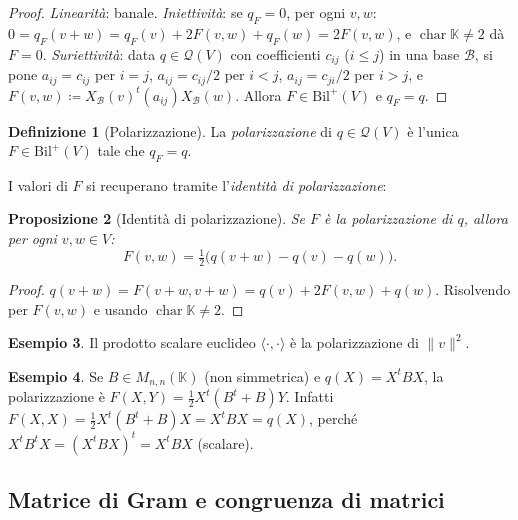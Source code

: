 \documentclass[11pt, a4paper]{book}
\theoremstyle{definition}
\newtheorem{definizione}{Definizione}[section]
\newtheorem{esempio}[definizione]{Esempio}
\theoremstyle{plain}
\newtheorem{proposizione}[definizione]{Proposizione}
\theoremstyle{remark}
\newcommand{\K}{\mathbb{K}}
\DeclareMathOperator{\car}{char}
\begin{document}
\begin{proof}
\textit{Linearità}: banale. \textit{Iniettività}: se $q_F = 0$, per ogni $v,w$: $0 = q_F(v+w) = q_F(v)+2F(v,w)+q_F(w) = 2F(v,w)$, e $\car\K\neq 2$ dà $F = 0$. \textit{Suriettività}: data $q \in \mathcal{Q}(V)$ con coefficienti $c_{ij}$ ($i \le j$) in una base $\mathcal{B}$, si pone $a_{ij} = c_{ij}$ per $i=j$, $a_{ij} = c_{ij}/2$ per $i < j$, $a_{ij} = c_{ji}/2$ per $i > j$, e $F(v,w) \coloneqq X_\mathcal{B}(v)^t (a_{ij}) X_\mathcal{B}(w)$. Allora $F \in \mathrm{Bil}^+(V)$ e $q_F = q$.
\end{proof}

\begin{defbox}
\begin{definizione}[Polarizzazione]
\label{def:polarizzazione}
La \emph{polarizzazione} di $q \in \mathcal{Q}(V)$ è l'unica $F \in \mathrm{Bil}^+(V)$ tale che $q_F = q$.
\end{definizione}
\end{defbox}

I valori di $F$ si recuperano tramite l'\emph{identità di polarizzazione}:

\begin{proposizione}[Identità di polarizzazione]
\label{prop:id-pol}
Se $F$ è la polarizzazione di $q$, allora per ogni $v,w \in V$:
\[
  F(v,w) = \tfrac{1}{2}\bigl(q(v+w) - q(v) - q(w)\bigr).
\]
\end{proposizione}

\begin{proof}
$q(v+w) = F(v+w,v+w) = q(v)+2F(v,w)+q(w)$. Risolvendo per $F(v,w)$ e usando $\car\K \neq 2$.
\end{proof}

\begin{exbox}
\begin{esempio}
Il prodotto scalare euclideo $\langle\cdot,\cdot\rangle$ è la polarizzazione di $\|v\|^2$.
\end{esempio}
\end{exbox}

\begin{exbox}
\begin{esempio}
\label{es:pol-matrice}
Se $B \in M_{n,n}(\K)$ (non simmetrica) e $q(X) = X^t B X$, la polarizzazione è $F(X,Y) = \frac{1}{2}X^t(B^t+B)Y$. Infatti $F(X,X) = \frac{1}{2}X^t(B^t+B)X = X^tBX = q(X)$, perché $X^tB^tX = (X^tBX)^t = X^tBX$ (scalare).
\end{esempio}
\end{exbox}

\subsection{Matrice di Gram e congruenza di matrici}
\end{document}
